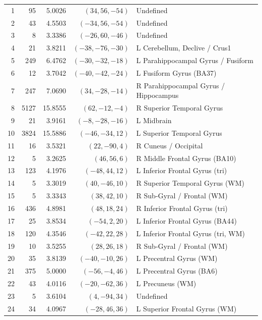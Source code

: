 \documentclass[11pt,a4paper]{article}
\begin{document}
\begin{longtable}{@{}r r r r l@{}}
1  & 95   & 5.0026  & $(34, 56, -54)$    & Undefined \\
2  & 43   & 4.5503  & $(-34, 56, -54)$   & Undefined \\
3  & 8    & 3.3386  & $(-26, 60, -46)$   & Undefined \\
4  & 21   & 3.8211  & $(-38, -76, -30)$  & L Cerebellum, Declive / Crus1 \\
5  & 249  & 6.4762  & $(-30, -32, -18)$  & L Parahippocampal Gyrus / Fusiform \\
6  & 12   & 3.7042  & $(-40, -42, -24)$  & L Fusiform Gyrus (BA37) \\
7  & 247  & 7.0690  & $(34, -28, -14)$   & R Parahippocampal Gyrus / Hippocampus \\
8  & 5127 & 15.8555 & $(62, -12, -4)$    & R Superior Temporal Gyrus \\
9  & 21   & 3.9161  & $(-8, -28, -16)$   & L Midbrain \\
10 & 3824 & 15.5886 & $(-46, -34, 12)$   & L Superior Temporal Gyrus \\
11 & 16   & 3.5321  & $(22, -90, 4)$     & R Cuneus / Occipital \\
12 & 5    & 3.2625  & $(46, 56, 6)$      & R Middle Frontal Gyrus (BA10) \\
13 & 123  & 4.1976  & $(-48, 44, 12)$    & L Inferior Frontal Gyrus (tri) \\
14 & 5    & 3.3019  & $(40, -46, 10)$    & R Superior Temporal Gyrus (WM) \\
15 & 5    & 3.3343  & $(38, 42, 10)$     & R Sub-Gyral / Frontal (WM) \\
16 & 436  & 4.8981  & $(48, 18, 24)$     & R Inferior Frontal Gyrus (tri) \\
17 & 25   & 3.8534  & $(-54, 2, 20)$     & L Inferior Frontal Gyrus (BA44) \\
18 & 120  & 4.3546  & $(-42, 22, 28)$    & L Inferior Frontal Gyrus (tri, WM) \\
19 & 10   & 3.5255  & $(28, 26, 18)$     & R Sub-Gyral / Frontal (WM) \\
20 & 35   & 3.8139  & $(-40, -10, 26)$   & L Precentral Gyrus (WM) \\
21 & 375  & 5.0000  & $(-56, -4, 46)$    & L Precentral Gyrus (BA6) \\
22 & 43   & 4.0116  & $(-20, -62, 36)$   & L Precuneus (WM) \\
23 & 5    & 3.6104  & $(4, -94, 34)$     & Undefined \\
24 & 34   & 4.0967  & $(-28, 46, 36)$    & L Superior Frontal Gyrus (WM) \\

\end{longtable}
\end{document}
